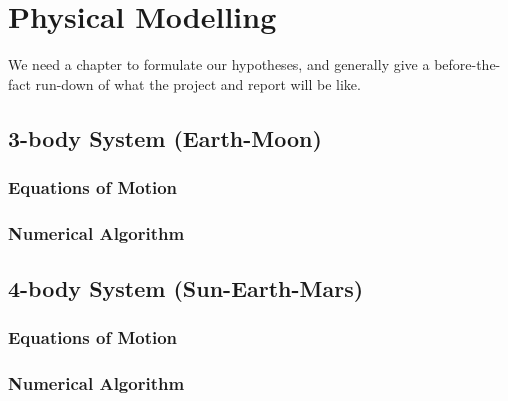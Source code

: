 
\chapter{Physical Modelling}
We need a chapter to formulate our hypotheses, and generally give a before-the-fact run-down of what the project and report will be like.

\section{3-body System (Earth-Moon)}

\subsection{Equations of Motion}

\subsection{Numerical Algorithm}

\section{4-body System (Sun-Earth-Mars)}

\subsection{Equations of Motion}

\subsection{Numerical Algorithm}
